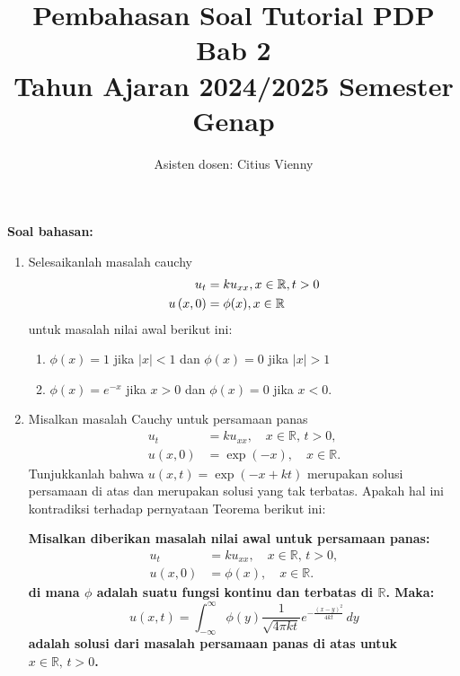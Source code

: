 \documentclass{article}
\title{Pembahasan Soal Tutorial PDP Bab 2 \\
Tahun Ajaran 2024/2025 Semester Genap}
\author{Asisten dosen: Citius Vienny}
\begin{document}
\maketitle

\noindent

\noindent
\textbf{Soal bahasan:}
\begin{enumerate}
    \item Selesaikanlah masalah cauchy
\begin{align*}
u_t &= ku_{xx}, x \in \mathbb{R}, t > 0 \\
u\left(x,0\right) &= \phi{\left(x\right)}, x \in \mathbb{R}
\end{align*}
untuk masalah nilai awal berikut ini:
\begin{enumerate}
\item $\phi(x) = 1$ jika $|x| < 1$ dan $\phi(x) = 0$ jika $|x| > 1$
\item $\phi(x) = e^{-x}$ jika $x > 0$ dan $\phi(x) = 0$ jika $x < 0$.
\end{enumerate}

\item Misalkan masalah Cauchy untuk persamaan panas
\begin{align*}
u_t &= k u_{xx}, \quad x \in \mathbb{R}, \, t > 0, \\
u(x, 0) &= \exp(-x), \quad x \in \mathbb{R}.
\end{align*}
Tunjukkanlah bahwa \( u(x, t) = \exp(-x + kt) \) merupakan solusi persamaan di atas dan merupakan solusi yang tak terbatas. Apakah hal ini kontradiksi terhadap pernyataan Teorema berikut ini:

\textbf{Misalkan diberikan masalah nilai awal untuk persamaan panas:  
\begin{align*}  
u_t &= k u_{xx}, \quad x \in \mathbb{R}, \, t > 0, \\  
u(x, 0) &= \phi(x), \quad x \in \mathbb{R}.  
\end{align*}  
di mana \(\phi\) adalah suatu fungsi kontinu dan terbatas di \(\mathbb{R}\). Maka:  
\[  
u(x, t) = \int_{-\infty}^{\infty} \phi(y) \frac{1}{\sqrt{4 \pi kt}} e^{-\frac{(x-y)^2}{4kt}} \, dy  
\]  
adalah solusi dari masalah persamaan panas di atas untuk \(x \in \mathbb{R}, \, t > 0\).}


\end{enumerate}
\end{document}
